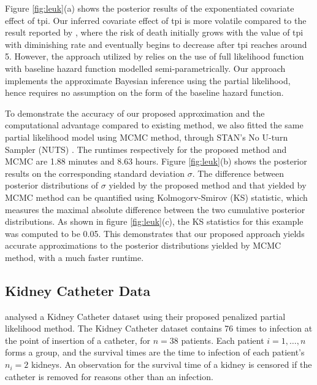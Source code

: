 \documentclass[ba]{imsart}
\begin{document}
Figure \ref{fig:leuk}(a) shows the posterior results of the exponentiated covariate effect of tpi. Our inferred covariate effect of tpi is more volatile compared to the result reported by \cite{inlacoxph}, where the risk of death initially grows with the value of tpi with diminishing rate and eventually begins to decrease after tpi reaches around 5. However, the approach utilized by \cite{inlacoxph} relies on the use of full likelihood function with baseline hazard function modelled semi-parametrically. Our approach implements the approximate Bayesian inference using the partial likelihood, hence requires no assumption on the form of the baseline hazard function. 

To demonstrate the accuracy of our proposed approximation and the computational advantage compared to existing method, we also fitted the same partial likelihood model using MCMC method, through STAN's No U-turn Sampler (NUTS) \cite{NUTS}. The runtimes respectively for the proposed method and MCMC are 1.88 minutes and 8.63 hours. Figure \ref{fig:leuk}(b) shows the posterior results on the corresponding standard deviation $\sigma$. The difference between posterior distributions of $\sigma$ yielded by the proposed method and that yielded by MCMC method can be quantified using Kolmogorv-Smirov (KS) statistic, which measures the maximal absolute difference between the two cumulative posterior distributions. As shown in figure \ref{fig:leuk}(c), the KS statistics for this example was computed to be 0.05. This demonstrates that our proposed approach yields accurate approximations to the posterior distributions yielded by MCMC method, with a much faster runtime.




\subsection{Kidney Catheter Data}\label{subsec:kidney}

\cite{freqPL} analysed a Kidney Catheter dataset using their proposed penalized partial likelihood method. The Kidney Catheter dataset contains 76 times to infection at the point of insertion of a catheter, for $n = 38$ patients. Each patient $i=1,\ldots,n$ forms a group, and the survival times are the time to infection of each patient's $n_{i} = 2$ kidneys. An observation for the survival time of a kidney is censored if the catheter is removed for reasons other than an infection. 
\end{document}
